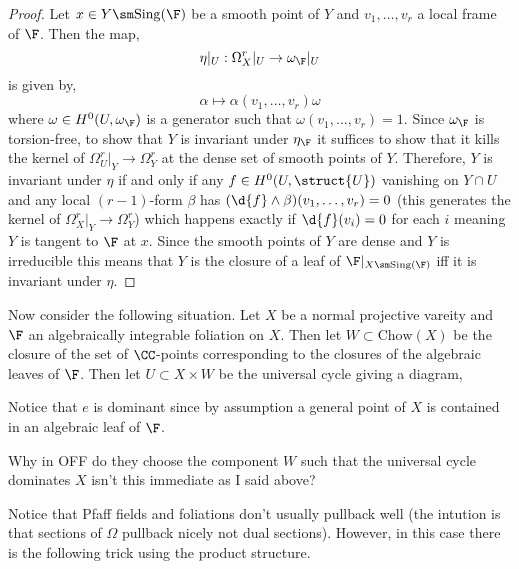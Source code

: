 \documentclass[12pt]{article}
\begin{document}
\begin{proof}
Let $x \in Y \sm \Sing(\F)$ be a smooth point of $Y$ and $v_1, \dots, v_r$ a local frame of $\F$. Then the map,
\[ \eta|_U : \Omega_X^r|_U \to \omega_\F|_U \]
is given by,
\[ \alpha \mapsto \alpha(v_1, \dots, v_r) \omega \]
where $\omega \in H^0(U, \omega_\F)$ is a generator such that $\omega(v_1, \dots, v_r) = 1$. Since $\omega_\F$ is torsion-free, to show that $Y$ is invariant under $\eta_{\F}$ it suffices to show that it kills the kernel of $\Omega^r_U|_Y \to \Omega^r_Y$ at the dense set of smooth points of $Y$. Therefore, $Y$ is invariant under $\eta$ if and only if any $f \in H^0(U, \struct{U})$ vanishing on $Y \cap U$ and any local $(r-1)$-form $\beta$ has $(\d{f} \wedge \beta)(v_1, \dots, v_r) = 0$ (this generates the kernel of $\Omega_X^r|_Y \to \Omega^r_Y$) which happens exactly if $\d{f}(v_i) = 0$ for each $i$ meaning $Y$ is tangent to $\F$ at $x$. Since the smooth points of $Y$ are dense and $Y$ is irreducible this means that $Y$ is the closure of a leaf of $\F|_{X \sm \Sing(\F)}$ iff it is invariant under $\eta$. 
\end{proof}

\newcommand{\Chow}{\mathrm{Chow}}

Now consider the following situation. Let $X$ be a normal projective vareity and $\F$ an algebraically integrable foliation on $X$. Then let $W \subset \Chow(X)$ be the closure of the set of $\CC$-points corresponding to the closures of the algebraic leaves of $\F$. Then let $U \subset X \times W$ be the universal cycle giving a diagram,
\begin{center}
\end{center}
Notice that $e$ is dominant since by assumption a general point of $X$ is contained in an algebraic leaf of $\F$. 

\begin{rmk}
Why in OFF do they choose the component $W$ such that the universal cycle dominates $X$ isn't this immediate as I said above?
\end{rmk}

\begin{rmk}
Notice that Pfaff fields and foliations don't usually pullback well (the intution is that sections of $\Omega$ pullback nicely not dual sections). However, in this case there is the following trick using the product structure.
\end{rmk}
\end{document}
